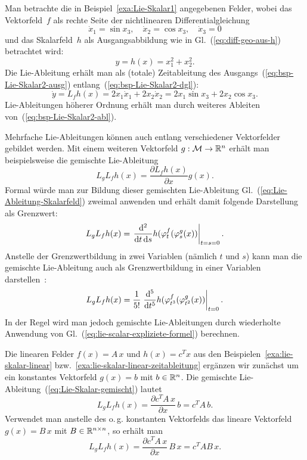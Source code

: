 \begin{example}
Man betrachte die in Beispiel~\ref{exa:Lie-Skalar1} angegebenen
Felder, wobei das Vektorfeld~$f$ als rechte Seite der nichtlinearen
Differentialgleichung 
\begin{equation}
\dot{x}_{1}=\sin x_{3},\quad\dot{x}_{2}=\cos x_{3},\quad\dot{x}_{3}=0\label{eq:bsp-Lie-Skalar2-dgl}
\end{equation}
und das Skalarfeld~$h$ als Ausgangsabbildung wie in Gl.~(\ref{eq:diff-geo-aus-h})
betrachtet wird: 
\begin{equation}
y=h(x)=x_{1}^{2}+x_{2}^{2}.\label{eq:bsp-Lie-Skalar2-ausg}
\end{equation}
Die Lie-Ableitung erhält man als (totale) Zeitableitung des Ausgangs~(\ref{eq:bsp-Lie-Skalar2-ausg})
entlang~(\ref{eq:bsp-Lie-Skalar2-dgl}):
\begin{equation}
\dot{y}=L_{f}h(x)=2x_{1}\dot{x}_{1}+2x_{2}\dot{x}_{2}=2x_{1}\sin x_{3}+2x_{2}\cos x_{3}.\label{eq:bsp-Lie-Skalar2-abl}
\end{equation}
Lie-Ableitungen höherer Ordnung erhält man durch weiteres Ableiten
von~(\ref{eq:bsp-Lie-Skalar2-abl}).
\end{example}
\medskip{}

Mehrfache Lie-Ableitungen können auch entlang verschiedener Vektorfelder
gebildet werden. Mit einem weiteren Vektorfeld $g:\mathcal{M}\to{\mathbb{R}}^{n}$
erhält man beispielsweise die gemischte Lie-Ableitung 
\begin{equation}
L_{g}L_{f}h(x)=\frac{\partial L_{f}h(x)}{\partial x}g(x).\label{eq:Lie-Skalar-gemischt}
\end{equation}
Formal würde man zur Bildung dieser gemischten Lie-Ableitung Gl.~(\ref{eq:Lie-Ableitung-Skalarfeld})
zweimal anwenden und erhält damit folgende Darstellung als Grenzwert:
\[
L_{g}L_{f}h(x)=\left.\frac{{\mathrm{d}}^{2}}{{\mathrm{d}} t\,{\mathrm{d}} s}h(\varphi_{t}^{f}(\varphi_{s}^{g}(x))\right|_{t=s=0}.
\]
Anstelle der Grenzwertbildung in zwei Variablen (nämlich $t$ und
$s$) kann man die gemischte Lie-Ableitung auch als Grenzwertbildung
in einer Variablen darstellen~\cite{roebenack2008cam,roebenack2010pamm}:
\[
L_{g}L_{f}h(x)=\frac{1}{5!}\left.\frac{{\mathrm{d}}^{5}}{{\mathrm{d}} t^{5}}h(\varphi_{t^{3}}^{f}(\varphi_{t^{2}}^{g}(x))\right|_{t=0}.
\]
In der Regel wird man jedoch gemischte Lie-Ableitungen durch wiederholte
Anwendung von Gl.~(\ref{eq:lie-scalar-expliziete-formel}) berechnen.
\begin{example}
\label{exa:Lie-skalar-linear-konstant-gemischt}Die linearen Felder
$f(x)=A\,x$ und $h(x)=c^{T}x$ aus den Beispielen~\ref{exa:lie-skalar-linear}
bzw.~\ref{exa:lie-skalar-linear-zeitableitung} ergänzen wir zunächst
um ein konstantes Vektorfeld $g(x)=b$ mit $b\in{\mathbb{R}}^{n}$. Die gemischte
Lie-Ableitung~(\ref{eq:Lie-Skalar-gemischt}) lautet
\[
L_{g}L_{f}h(x)=\frac{\partial c^{T}A\,x}{\partial x}\,b=c^{T}A\,b.
\]
Verwendet man anstelle des o.\,g. konstanten Vektorfelds das lineare
Vektorfeld $g(x)=B\,x$ mit $B\in{\mathbb{R}}^{n\times n}$, so erhält man 
\[
L_{g}L_{f}h(x)=\frac{\partial c^{T}A\,x}{\partial x}\,B\,x=c^{T}AB\,x.
\]
\end{example}
\medskip{}

